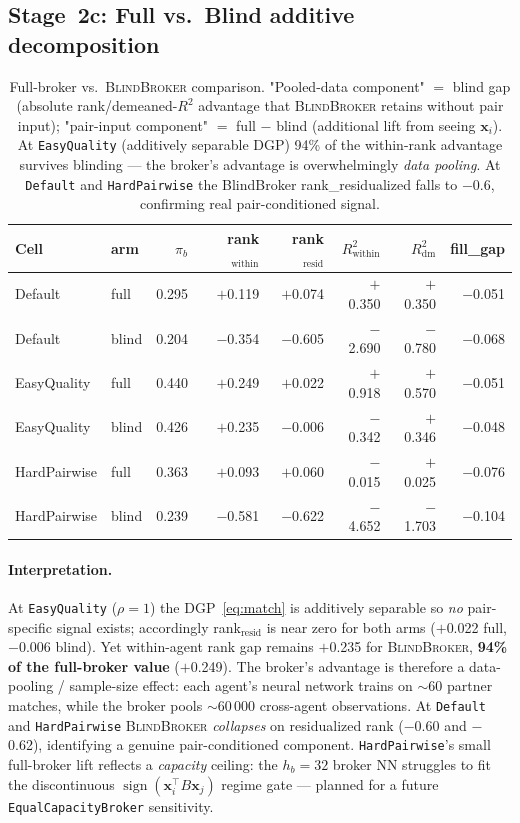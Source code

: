 \documentclass[11pt,a4paper]{article}
\newcommand{\xvec}{\mathbf{x}}
\begin{document}
\subsection{Stage~2c: Full vs.\ Blind additive decomposition}
\begin{table}[h]\centering\small
\caption{Full-broker vs.\ \textsc{BlindBroker} comparison. "Pooled-data component" $=$ blind gap (absolute rank/demeaned-$R^2$ advantage that \textsc{BlindBroker} retains without pair input); "pair-input component" $=$ full $-$ blind (additional lift from seeing $\xvec_i$). At \texttt{EasyQuality} (additively separable DGP) 94\% of the within-rank advantage survives blinding --- the broker's advantage is overwhelmingly \emph{data pooling}. At \texttt{Default} and \texttt{HardPairwise} the BlindBroker rank\_residualized falls to $-$0.6, confirming real pair-conditioned signal.}
\label{tab:c2c}
\begin{tabular}{@{}llrrrrrr@{}}
\toprule
Cell & arm & $\pi_b$ & rank$_{\text{within}}$ & rank$_{\text{resid}}$ & $R^2_{\text{within}}$ & $R^2_{\text{dm}}$ & fill\_gap \\
\midrule
Default & full   & 0.295 & $+$0.119 & $+$0.074 & $+$0.350 & $+$0.350 & $-$0.051 \\
Default & blind  & 0.204 & $-$0.354 & $-$0.605 & $-$2.690 & $-$0.780 & $-$0.068 \\
EasyQuality & full  & 0.440 & $+$0.249 & $+$0.022 & $+$0.918 & $+$0.570 & $-$0.051 \\
EasyQuality & blind & 0.426 & $+$0.235 & $-$0.006 & $-$0.342 & $+$0.346 & $-$0.048 \\
HardPairwise & full  & 0.363 & $+$0.093 & $+$0.060 & $-$0.015 & $+$0.025 & $-$0.076 \\
HardPairwise & blind & 0.239 & $-$0.581 & $-$0.622 & $-$4.652 & $-$1.703 & $-$0.104 \\
\bottomrule
\end{tabular}
\end{table}

\paragraph{Interpretation.} At \texttt{EasyQuality} ($\rho=1$) the DGP~\eqref{eq:match} is additively separable so \emph{no} pair-specific signal exists; accordingly rank$_{\text{resid}}$ is near zero for both arms ($+$0.022 full, $-$0.006 blind). Yet within-agent rank gap remains $+$0.235 for \textsc{BlindBroker}, \textbf{94\% of the full-broker value} ($+$0.249). The broker's advantage is therefore a data-pooling / sample-size effect: each agent's neural network trains on $\sim$60 partner matches, while the broker pools $\sim$60\,000 cross-agent observations. At \texttt{Default} and \texttt{HardPairwise} \textsc{BlindBroker} \emph{collapses} on residualized rank ($-$0.60 and $-$0.62), identifying a genuine pair-conditioned component. \texttt{HardPairwise}'s small full-broker lift reflects a \emph{capacity} ceiling: the $h_b{=}32$ broker NN struggles to fit the discontinuous $\operatorname{sign}(\xvec_i^\top B\xvec_j)$ regime gate --- planned for a future \texttt{EqualCapacityBroker} sensitivity.
\end{document}

